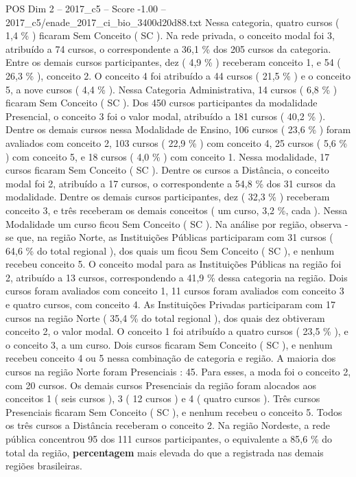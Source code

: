 \begin{textsample}{POS Dim 2 – 2017\_c5 – Score -1.00 – 2017\_c5/enade\_2017\_ci\_bio\_3400d20d88.txt}
Nessa categoria, quatro cursos ( 1,4 \% ) ficaram Sem Conceito ( SC ).
Na rede privada, o conceito modal foi 3, atribuído a 74 cursos, o correspondente a 36,1 \% dos 205 cursos da categoria.
Entre os demais cursos participantes, dez ( 4,9 \% ) receberam conceito 1, e 54 ( 26,3 \% ), conceito 2.
O conceito 4 foi atribuído a 44 cursos ( 21,5 \% ) e o conceito 5, a nove cursos ( 4,4 \% ).
Nessa Categoria Administrativa, 14 cursos ( 6,8 \% ) ficaram Sem Conceito ( SC ).
Dos 450 cursos participantes da modalidade Presencial, o conceito 3 foi o valor modal, atribuído a 181 cursos ( 40,2 \% ).
Dentre os demais cursos nessa Modalidade de Ensino, 106 cursos ( 23,6 \% ) foram avaliados com conceito 2, 103 cursos ( 22,9 \% ) com conceito 4, 25 cursos ( 5,6 \% ) com conceito 5, e 18 cursos ( 4,0 \% ) com conceito 1.
Nessa modalidade, 17 cursos ficaram Sem Conceito ( SC ).
Dentre os cursos a Distância, o conceito modal foi 2, atribuído a 17 cursos, o correspondente a 54,8 \% dos 31 cursos da modalidade.
Dentre os demais cursos participantes, dez ( 32,3 \% ) receberam conceito 3, e três receberam os demais conceitos ( um curso, 3,2 \%, cada ).
Nessa Modalidade um curso ficou Sem Conceito ( SC ).
Na análise por região, observa -se que, na região Norte, as Instituições Públicas participaram com 31 cursos ( 64,6 \% do total regional ), dos quais um ficou Sem Conceito ( SC ), e nenhum recebeu conceito 5.
O conceito modal para as Instituições Públicas na região foi 2, atribuído a 13 cursos, correspondendo a 41,9 \% dessa categoria na região.
Dois cursos foram avaliados com conceito 1, 11 cursos foram avaliados com conceito 3 e quatro cursos, com conceito 4.
As Instituições Privadas participaram com 17 cursos na região Norte ( 35,4 \% do total regional ), dos quais dez obtiveram conceito 2, o valor modal.
O conceito 1 foi atribuído a quatro cursos ( 23,5 \% ), e o conceito 3, a um curso.
Dois cursos ficaram Sem Conceito ( SC ), e nenhum recebeu conceito 4 ou 5 nessa combinação de categoria e região.
A maioria dos cursos na região Norte foram Presenciais : 45.
Para esses, a moda foi o conceito 2, com 20 cursos.
Os demais cursos Presenciais da região foram alocados aos conceitos 1 ( seis cursos ), 3 ( 12 cursos ) e 4 ( quatro cursos ).
Três cursos Presenciais ficaram Sem Conceito ( SC ), e nenhum recebeu o conceito 5.
Todos os três cursos a Distância receberam o conceito 2.
Na região Nordeste, a rede pública concentrou 95 dos 111 cursos participantes, o equivalente a 85,6 \% do total da região, \textbf{percentagem} mais elevada do que a registrada nas demais regiões brasileiras.

\end{textsample}
